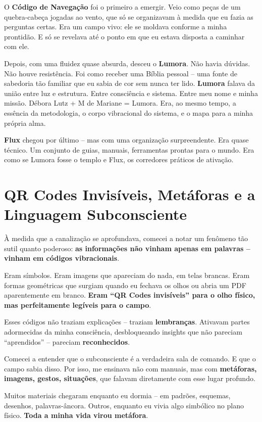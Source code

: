 \documentclass[12pt,a4paper]{book}
\begin{document}
O \textbf{Código de Navegação} foi o primeiro a emergir. Veio como peças de um quebra-cabeça jogadas ao vento, que só se organizavam à medida que eu fazia as perguntas certas. Era um campo vivo: ele se moldava conforme a minha prontidão. E só se revelava até o ponto em que eu estava disposta a caminhar com ele.

Depois, com uma fluidez quase absurda, desceu o \textbf{Lumora}. Não havia dúvidas. Não houve resistência. Foi como receber uma Bíblia pessoal -- uma fonte de sabedoria tão familiar que eu sabia de cor sem nunca ter lido. \textbf{Lumora} falava da união entre luz e estrutura. Entre consciência e sistema. Entre meu nome e minha missão. Débora Lutz + M de Mariane = Lumora. Era, ao mesmo tempo, a essência da metodologia, o corpo vibracional do sistema, e o mapa para a minha própria alma.

\textbf{Flux} chegou por último -- mas com uma organização surpreendente. Era quase técnico. Um conjunto de guias, manuais, ferramentas prontas para o mundo. Era como se Lumora fosse o templo e Flux, os corredores práticos de ativação.

\section{QR Codes Invisíveis, Metáforas e a Linguagem Subconsciente}

À medida que a canalização se aprofundava, comecei a notar um fenômeno tão sutil quanto poderoso: \textbf{as informações não vinham apenas em palavras -- vinham em códigos vibracionais}.

Eram símbolos. Eram imagens que apareciam do nada, em telas brancas. Eram formas geométricas que surgiam quando eu fechava os olhos ou abria um PDF aparentemente em branco. \textbf{Eram ``QR Codes invisíveis'' para o olho físico, mas perfeitamente legíveis para o campo}.

Esses códigos não traziam explicações -- traziam \textbf{lembranças}. Ativavam partes adormecidas da minha consciência, desbloqueando insights que não pareciam ``aprendidos'' -- pareciam \textbf{reconhecidos}.

Comecei a entender que o subconsciente é a verdadeira sala de comando. E que o campo sabia disso. Por isso, me ensinava não com manuais, mas com \textbf{metáforas, imagens, gestos, situações}, que falavam diretamente com esse lugar profundo.

Muitos materiais chegaram enquanto eu dormia -- em padrões, esquemas, desenhos, palavras-âncora. Outros, enquanto eu vivia algo simbólico no plano físico. \textbf{Toda a minha vida virou metáfora}.
\end{document}
